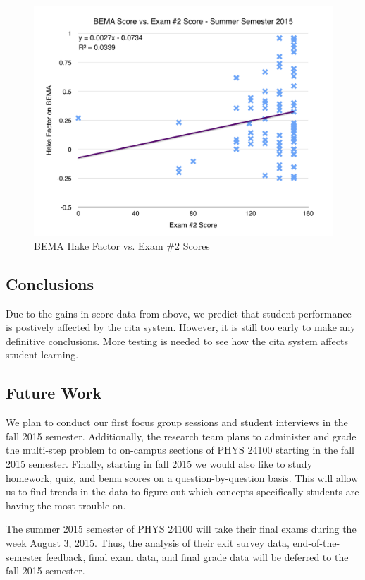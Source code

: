 \begin{figure}[!htb]
	\centering
	\includegraphics[width=6in]{img/chapter4/bema_vs_ex2_su15}
	\caption[BEMA Hake Factor vs. Exam \#2 Scores]{BEMA Hake Factor vs. Exam \#2 Scores}
  \label{fig:bemaVsExTwoSu15}
\end{figure}

\subsection{Conclusions}

Due to the gains in score data from above, we predict that student performance is postively affected by the \gls{cita} system. However, it is still too early to make any definitive conclusions. More testing is needed to see how the \gls{cita} system affects student learning.

\subsection{Future Work}

We plan to conduct our first focus group sessions and student interviews in the fall 2015 semester. Additionally, the research team plans to administer and grade the multi-step problem to on-campus sections of PHYS 24100 starting in the fall 2015 semester. Finally, starting in fall 2015 we would also like to study homework, quiz, and \gls{bema} scores on a question-by-question basis. This will allow us to find trends in the data to figure out which concepts specifically students are having the most trouble on.

The summer 2015 semester of PHYS 24100 will take their final exams during the week August 3, 2015. Thus, the analysis of their exit survey data, end-of-the-semester feedback, final exam data, and final grade data will be deferred to the fall 2015 semester.
